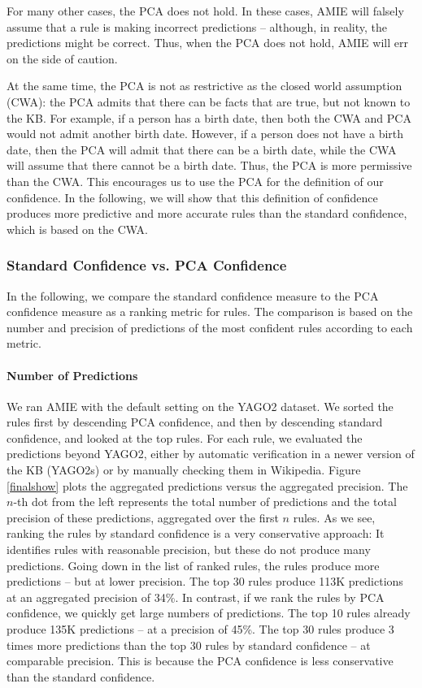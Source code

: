 For many other cases, the PCA does not hold. In these cases, AMIE will falsely assume that a rule is making incorrect predictions -- although, in reality,
the predictions might be correct.
Thus, when the PCA does not hold, AMIE will err on the side of caution.

At the same time, the PCA is not as restrictive as the closed world assumption (CWA):
the PCA admits that there can be facts that are true, but not known to the KB.
For example, if a person has a birth date, then both the CWA and PCA would not admit another birth date. However, if a person does not have a birth date, then the PCA will admit that there can be a birth date, while the CWA will assume that there cannot be a birth date. Thus, the PCA is more permissive than the CWA.
This encourages us to use the PCA for the definition of our confidence. In the following, we will show that this definition of confidence produces
 more predictive and more accurate rules than the standard confidence, which is based on the CWA.

\subsubsection{Standard Confidence vs. PCA Confidence }
\label{subsubsec:std_vs_pca}
In the following, we compare the standard confidence measure to the PCA confidence measure as a ranking metric for rules.
The comparison is based on the number and precision of predictions of the most confident rules according to each metric.

\paragraph{Number of Predictions}
We ran AMIE with the default setting on the YAGO2 dataset. %
We sorted the rules first by descending PCA confidence, and then by descending standard confidence, and looked at the top rules.
For each rule, we evaluated the predictions beyond YAGO2, either by automatic verification in a
newer version of the KB (YAGO2s) or by manually checking them in Wikipedia.
Figure \ref{finalshow} plots the aggregated predictions versus the aggregated precision.
The $n$-th dot from the left represents the total number of predictions and the total precision of these predictions, aggregated over the first $n$ rules.
As we see, ranking the rules by standard confidence is a very conservative approach:
It identifies rules with reasonable precision, but these do not produce many predictions.
Going down in the list of ranked rules, the rules produce more predictions -- but at lower precision. The top 30 rules produce 113K predictions at an aggregated precision of 34\%.
In contrast, if we rank the rules by PCA confidence, we quickly get large numbers of predictions. The top 10 rules already produce 135K predictions -- at a precision of 45\%.
The top 30 rules produce 3 times more predictions than the top 30 rules by standard confidence -- at comparable precision.
This is because the PCA confidence is less conservative than the standard confidence.

